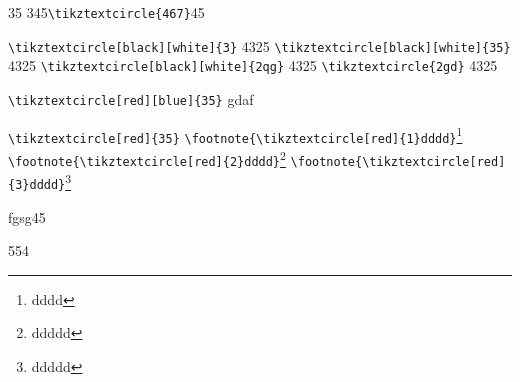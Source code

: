 \documentclass{ctexart}
\begin{document}
35 345\verb|\tikztextcircle{467}|45

 \verb|\tikztextcircle[black][white]{3}| 4325
   \verb|\tikztextcircle[black][white]{35}| 4325
  \verb|\tikztextcircle[black][white]{2qg}| 4325
    \verb|\tikztextcircle{2gd}| 4325
 
  \verb|\tikztextcircle[red][blue]{35}| gdaf
  
   \verb|\tikztextcircle[red]{35}|
   \verb|\footnote{\tikztextcircle[red]{1}dddd}|\footnote{dddd}
   \verb|\footnote{\tikztextcircle[red]{2}dddd}|\footnote{ddddd}
   \verb|\footnote{\tikztextcircle[red]{3}dddd}|\footnote{ddddd}

fgsg45
   
\newcommand{\wcnt}{}

\wcnt5\wcnt5\wcnt4\wcnt\wcnt
\end{document}
